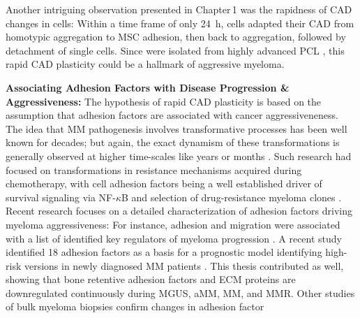 \unnsubsection{\cadplasticitytitle}%
\label{sec:discussion_caddadaptability}%
Another intriguing observation presented in Chapter\,1 was the rapidness of
\ac{CAD} changes in \INA cells: Within a time frame of only \SI{24}{\hour},
\INA cells adapted their \ac{CAD} from homotypic aggregation to \ac{MSC}
adhesion, then back to aggregation, followed by detachment of single cells.
Since \INA were isolated from highly advanced \ac{PCL}
\cite{burgerGp130RasMediated2001}, this rapid \ac{CAD} plasticity could be a
hallmark of aggressive myeloma.



\textbf{Associating Adhesion Factors with Disease Progression \& Aggressiveness:}
The hypothesis of rapid \ac{CAD} plasticity is based on the assumption that
adhesion factors are associated with cancer aggressiveneness.
The idea that MM pathogenesis involves transformative processes has been well
known for decades; but again, the exact dynamism of these transformations is
generally observed at higher time-scales like years or months
\cite{hallekMultipleMyelomaIncreasing1998}. Such research had focused on
transformations in resistance mechanisms acquired during chemotherapy, with cell
adhesion factors being a well established driver of survival signaling via
NF-$\kappa$B and selection of drug-resistance myeloma clones
\cite{landowskiCellAdhesionmediatedDrug2003,
      solimandoDrugResistanceMultiple2022}.%
Recent research focuses on a detailed characterization of adhesion factors
driving myeloma aggressiveness: For instance, adhesion and migration were
associated with a list of identified key regulators of myeloma
progression%
\cite{shenProgressionSignatureUnderlies2021}.%
A recent study identified 18
adhesion factors as a basis for a prognostic model identifying high-risk
versions in newly diagnosed MM patients
\cite{huDevelopmentCellAdhesionbased2024}. This thesis contributed as well,
showing that bone retentive adhesion factors and \ac{ECM} proteins are
downregulated continuously during \ac{MGUS}, \ac{aMM}, \ac{MM}, and \ac{MMR}.
Other studies of bulk myeloma biopsies confirm changes in adhesion factor
